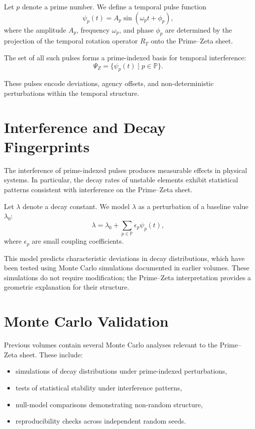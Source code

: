 \documentclass[11pt, letterpaper, openany]{book}
\begin{document}
Let $p$ denote a prime number. 
We define a temporal pulse function
\[
\psi_p(t) = A_p \sin(\omega_p t + \phi_p),
\]
where the amplitude $A_p$, frequency $\omega_p$, and phase $\phi_p$ are 
determined by the projection of the temporal rotation operator $R_T$ onto the 
Prime--Zeta sheet.

The set of all such pulses forms a prime-indexed basis for temporal 
interference:
\[
\Psi_Z = \{\psi_p(t) \mid p \in \mathbb{P}\}.
\]

These pulses encode deviations, agency offsets, and non-deterministic 
perturbations within the temporal structure.

\section{Interference and Decay Fingerprints}

The interference of prime-indexed pulses produces measurable effects in 
physical systems. 
In particular, the decay rates of unstable elements exhibit statistical 
patterns consistent with interference on the Prime--Zeta sheet.

Let $\lambda$ denote a decay constant. 
We model $\lambda$ as a perturbation of a baseline value $\lambda_0$:
\[
\lambda = \lambda_0 + \sum_{p \in \mathbb{P}} \epsilon_p \psi_p(t),
\]
where $\epsilon_p$ are small coupling coefficients.

This model predicts characteristic deviations in decay distributions, which 
have been tested using Monte Carlo simulations documented in earlier volumes. 
These simulations do not require modification; the Prime--Zeta interpretation 
provides a geometric explanation for their structure.

\section{Monte Carlo Validation}

Previous volumes contain several Monte Carlo analyses relevant to the 
Prime--Zeta sheet. 
These include:

\begin{itemize}
    \item simulations of decay distributions under prime-indexed perturbations,
    \item tests of statistical stability under interference patterns,
    \item null-model comparisons demonstrating non-random structure,
    \item reproducibility checks across independent random seeds.
\end{itemize}
\end{document}
